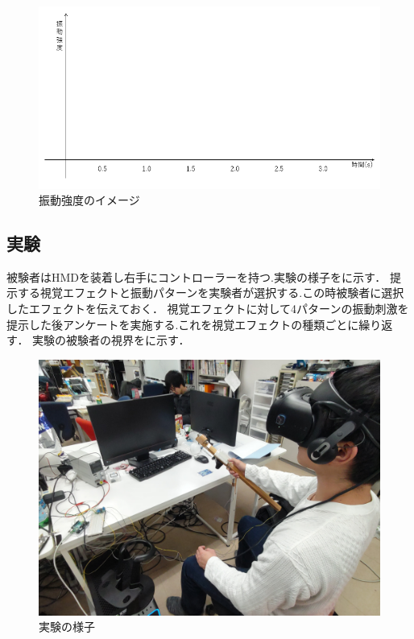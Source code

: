 \begin{figure}[h]
\centering
\includegraphics[clip,width=12cm]{./fig/ank.png}
\caption{振動強度のイメージ}\label{ank}
\end{figure}

\subsection{実験}
被験者はHMDを装着し右手にコントローラーを持つ.実験の様子をに示す．
提示する視覚エフェクトと振動パターンを実験者が選択する.この時被験者に選択したエフェクトを伝えておく．
視覚エフェクトに対して4パターンの振動刺激を提示した後アンケートを実施する.これを視覚エフェクトの種類ごとに繰り返す．
実験の被験者の視界をに示す．

\begin{figure}[h]
\centering
\includegraphics[clip,width=10m]{./fig/jikken.JPG}
\caption{実験の様子}\label{jikken}
\end{figure}


